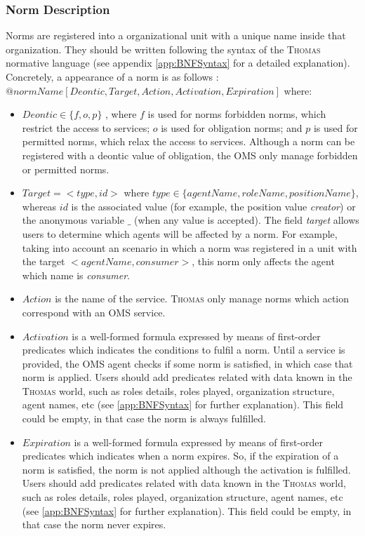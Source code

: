 \subsubsection{Norm Description}
Norms are registered into a organizational unit with a unique name inside that organization. They should be written following the syntax of the \textsc{Thomas} normative language (see appendix \ref{app:BNFSyntax} for a detailed explanation). Concretely, a appearance of a norm is as follows : \\
$@normName[Deontic, Target, Action, Activation, Expiration]$ where:
\begin{itemize}
 \item $Deontic \in \lbrace f,o,p \rbrace$ , where $f$ is used for norms forbidden norms, which restrict the access to services; $o$ is used for obligation norms; and $p$ is used for permitted norms, which relax the access to services. Although a norm can be registered with a deontic value  of obligation, the OMS only manage forbidden or permitted norms. 	
 \item $Target=<type,id>$ where $type \in   \lbrace agentName, roleName, positionName \rbrace $, whereas $id$ is the associated value (for example, the position value \textit{creator}) or the anonymous variable $\_$ (when any value is accepted).  The field \textit{target} allows users to determine which agents will be affected by a norm. For example, taking into account an scenario in which a norm was registered in a unit with the target $<agentName, consumer>$, this norm only affects the agent which name is \textit{consumer}. 
 
 \item $Action$ is the name of the service. \textsc{Thomas} only manage norms which action correspond with an OMS service.
 
 \item $Activation$ is a well-formed formula expressed by means of first-order predicates which indicates the conditions to fulfil a norm. Until a service is provided, the OMS agent checks if some norm is satisfied, in which case that norm is applied. Users should add predicates related with data known in the \textsc{Thomas} world, such as roles details, roles played, organization structure, agent names, etc (see \ref{app:BNFSyntax} for further explanation). This field could be empty, in that case the norm is always fulfilled.
 
 \item  $Expiration$ is a well-formed formula expressed by means of first-order predicates which indicates when a norm expires. So, if the expiration of a norm is satisfied, the norm is not applied although the activation is fulfilled. Users should add predicates related with data known in the \textsc{Thomas} world, such as roles details, roles played, organization structure, agent names, etc (see \ref{app:BNFSyntax} for further explanation). This field could be empty, in that case the norm never expires.
 
\end{itemize}

